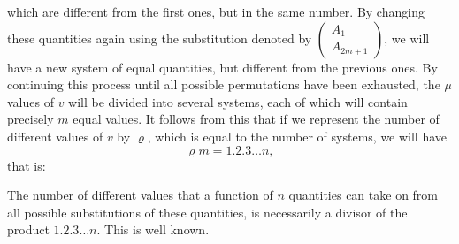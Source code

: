 \documentclass[oneside, 12 pt, leqno]{memoir}
\begin{document}
which are different from the first ones, but in the same number. By changing these quantities again using the substitution denoted by \(\left(\begin{array}{l}A_1 \\ A_{2 m+1}\end{array}\right)\), we will have a new system of equal quantities, but different from the previous ones. By continuing this process until all possible permutations have been exhausted, the \(\mu\) values of \(v\) will be divided into several systems, each of which will contain precisely \(m\) equal values. It follows from this that if we represent the number of different values of \(v\) by \(\varrho\), which is equal to the number of systems, we will have
\[\varrho m=1.2.3 \dots n,\]
that is:

The number of different values that a function of \(n\) quantities can take on from all possible substitutions of these quantities, is necessarily a divisor of the product \(1.2.3\dots n\). This is well known.
\end{document}
